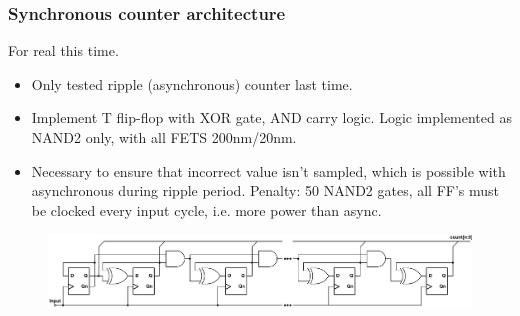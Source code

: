 \documentclass[t, screen, aspectratio=43]{beamer}
\begin{document}
\begin{frame}
	\frametitle{Synchronous counter architecture}
	\begin{block}{For real this time.}
	\tiny
	\begin{itemize}[itemsep=4pt,label=\protect---]
		\item Only tested ripple (asynchronous) counter last time. 
		\item Implement T flip-flop with XOR gate, AND carry logic. Logic implemented as NAND2 only, with all FETS 200nm/20nm. 
		\item Necessary to ensure that incorrect value isn't sampled, which is possible with asynchronous during ripple period. Penalty: 50 NAND2 gates, all FF's must be clocked every input cycle, i.e. more power than async.
	\end{itemize}
	\begin{figure}[htb!]
	        \centering
	        \includegraphics[width=1\textwidth, angle=0]{sync_counter.pdf}
	\end{figure}

	\end{block}	
\end{frame}
\end{document}
